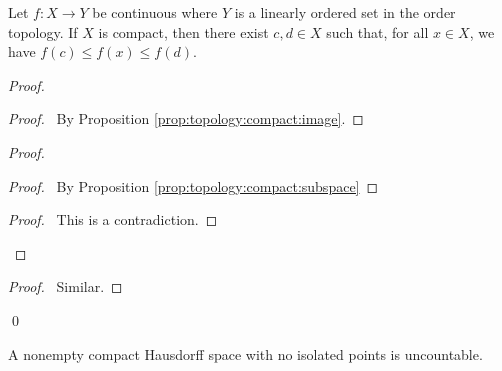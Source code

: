 \begin{thm}
  Let $f : X \rightarrow Y$ be continuous where $Y$ is a linearly ordered set
  in the order topology. If $X$ is compact, then there exist $c, d \in X$
  such
  that, for all $x \in X$, we have $f(c) \leq f(x) \leq f(d)$.
\end{thm}

\begin{proof}
  \pf
  \begin{proof}
    \pf\ By Proposition \ref{prop:topology:compact:image}.
  \end{proof}
  \begin{proof}
    \begin{proof}
      \pf\ By Proposition \ref{prop:topology:compact:subspace}
    \end{proof}
    \qedstep
    \begin{proof}
      \pf\ This is a contradiction.
    \end{proof}
  \end{proof}
  \begin{proof}
    \pf\ Similar.
  \end{proof}
  \qed
\end{proof}

\begin{thm}[DC]
  A nonempty compact Hausdorff space with no isolated points is uncountable.
\end{thm}

